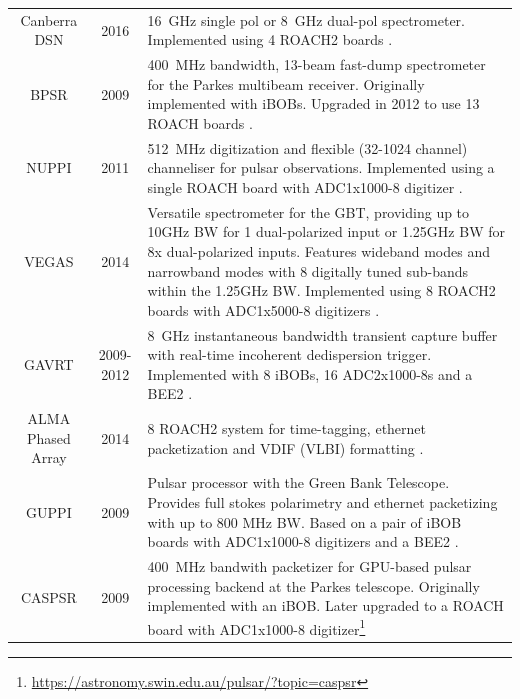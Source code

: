 \documentclass{ws-jai}
\begin{document}
\begin{table}
\begin{tabular}{ccp{10cm}}
  Canberra DSN     & 2016 & 16~GHz single pol or 8~GHz dual-pol spectrometer. Implemented using 4 ROACH2 boards \citep{Kocz, in prep}. \\
  BPSR             & 2009 & 400~MHz bandwidth, 13-beam fast-dump spectrometer for the Parkes multibeam receiver. Originally implemented with iBOBs. Upgraded in 2012 to use 13 ROACH boards \citep{2010MNRAS.409..619K}. \\
  NUPPI            & 2011 & 512~MHz digitization and flexible (32-1024 channel) channeliser for pulsar observations. Implemented using a single ROACH board with ADC1x1000-8 digitizer \citep{2014MNRAS.443.3752L}. \\
  VEGAS            & 2014 & Versatile spectrometer for the GBT, providing up to 10GHz BW for 1 dual-polarized input or 1.25GHz BW for 8x dual-polarized inputs. Features wideband modes and narrowband modes with 8 digitally tuned sub-bands within the 1.25GHz BW. Implemented using 8 ROACH2 boards with ADC1x5000-8 digitizers \citep{chennamangalam2014gpu}. \\
  GAVRT            & 2009-2012 & 8~GHz instantaneous bandwidth transient capture buffer with real-time incoherent dedispersion trigger. Implemented with 8 iBOBs, 16 ADC2x1000-8s and a BEE2 \citep{jon10, JonesDSS28}. \\
  ALMA Phased Array& 2014 & 8 ROACH2 system for time-tagging, ethernet packetization and VDIF (VLBI) formatting \citep{2012evn..confE..53A}. \\
  GUPPI            & 2009 & Pulsar processor with the Green Bank Telescope. Provides full stokes polarimetry and ethernet packetizing with up to 800 MHz BW. Based on a pair of iBOB boards with ADC1x1000-8 digitizers and a BEE2 \citep{guppi}. \\
  CASPSR           & 2009 & 400~MHz bandwith packetizer for GPU-based pulsar processing backend at the Parkes telescope. Originally implemented with an iBOB. Later upgraded to a ROACH board with ADC1x1000-8 digitizer\footnote{\url{https://astronomy.swin.edu.au/pulsar/?topic=caspsr}} \\
\end{tabular}
\end{table}
\end{document}
